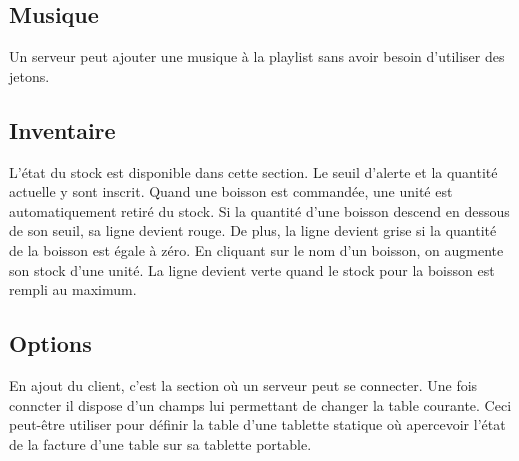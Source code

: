 \documentclass[a4paper,11pt]{article}
\begin{document}
\subsection{Musique}
Un serveur peut ajouter une musique à la playlist sans avoir besoin d'utiliser des jetons.

\subsection{Inventaire}
L'état du stock est disponible dans cette section. Le seuil d'alerte et la quantité actuelle y sont inscrit. Quand une boisson est commandée, une unité est automatiquement retiré du stock. Si la quantité d'une boisson descend en dessous de son seuil, sa ligne devient rouge. De plus, la ligne devient grise si la quantité de la boisson est égale à zéro. En cliquant sur le nom d'un boisson, on augmente son stock d'une unité. La ligne devient verte quand le stock pour la boisson est rempli au maximum.

\subsection{Options}

En ajout du client, c'est la section où un serveur peut se connecter. Une fois conncter il dispose d'un champs lui permettant de changer la table courante. Ceci peut-être utiliser pour définir la table d'une tablette statique où apercevoir l'état de la facture d'une table sur sa tablette portable.
\end{document}
